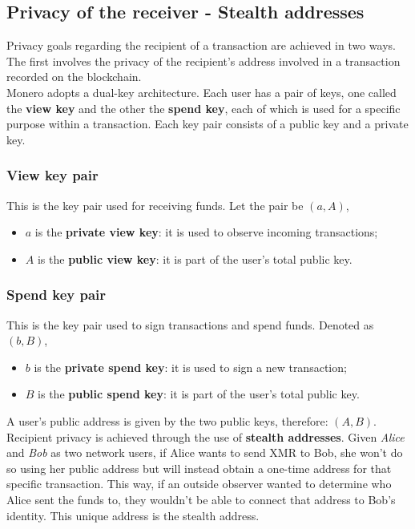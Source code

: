 \documentclass[conference]{IEEEtran}
\begin{document}

\subsection{Privacy of the receiver - Stealth addresses}
Privacy goals regarding the recipient of a transaction are achieved in two ways. The first involves the privacy of the recipient's address involved in a transaction recorded on the blockchain.\\
Monero adopts a dual-key architecture. Each user has a pair of keys, one called the \textbf{view key} and the other the \textbf{spend key}, each of which is used for a specific purpose within a transaction. Each key pair consists of a public key and a private key.

\subsubsection{View key pair}
This is the key pair used for receiving funds. Let the pair be $(a, A)$,
\begin{itemize}
\item $a$ is the \textbf{private view key}: it is used to observe incoming transactions;
\item $A$ is the \textbf{public view key}: it is part of the user's total public key.
\end{itemize}

\subsubsection{Spend key pair}
This is the key pair used to sign transactions and spend funds. Denoted as $(b, B)$,
\begin{itemize}
\item $b$ is the \textbf{private spend key}: it is used to sign a new transaction;
\item $B$ is the \textbf{public spend key}: it is part of the user's total public key.
\end{itemize}
A user's public address is given by the two public keys, therefore: $(A, B)$.\\

Recipient privacy is achieved through the use of \textbf{stealth addresses}. Given \textit{Alice} and \textit{Bob} as two network users, if Alice wants to send XMR to Bob, she won't do so using her public address but will instead obtain a one-time address for that specific transaction. This way, if an outside observer wanted to determine who Alice sent the funds to, they wouldn't be able to connect that address to Bob's identity. This unique address is the stealth address.\\
\end{document}
